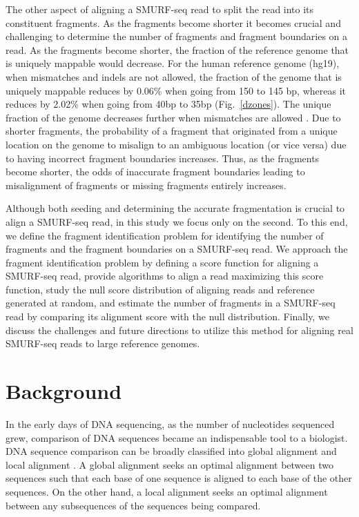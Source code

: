 The other aspect of aligning a SMURF-seq read to split the read into its
constituent fragments. As the fragments become shorter it becomes
crucial and challenging to determine the number of fragments and
fragment boundaries on a read.
%
As the fragments become shorter, the fraction of the reference genome
that is uniquely mappable would decrease. For the human reference genome
(hg19), when mismatches and indels are not allowed, the fraction of the
genome that is uniquely mappable reduces by 0.06\% when going from 150
to 145 bp, whereas it reduces by 2.02\% when going from 40bp to 35bp
(Fig.~\ref{dzones}).  The unique fraction of the genome decreases
further when mismatches are allowed \citep{derrien2012fast}.
Due to shorter fragments, the probability of a fragment that originated
from a unique location on the genome to misalign to an ambiguous
location (or vice versa) due to having incorrect fragment boundaries
increases.
%
Thus, as the fragments become shorter, the odds of inaccurate fragment
boundaries leading to misalignment of fragments or missing fragments
entirely increases.

Although both seeding and determining the accurate fragmentation is
crucial to align a SMURF-seq read, in this study we focus only on the
second.
%
To this end, we define the fragment identification problem for
identifying the number of fragments and the fragment boundaries on a
SMURF-seq read.  We approach the fragment identification problem by
defining a score function for aligning a SMURF-seq read, provide
algorithms to align a read maximizing this score function, study the
null score distribution of aligning reads and reference generated at
random, and estimate the number of fragments in a SMURF-seq read by
comparing its alignment score with the null distribution.
%
Finally, we discuss the challenges and future directions to utilize this
method for aligning real SMURF-seq reads to large reference genomes.



\section{Background}
\label{ch4_background}
In the early days of DNA sequencing, as the number of nucleotides
sequenced grew, comparison of DNA sequences became an indispensable tool
to a biologist.
%
DNA sequence comparison can be broadly classified into global alignment
\citep{needleman1970general} and local alignment
\citep{smith1981identification}. A global alignment seeks an optimal
alignment between two sequences such that each base of one sequence is
aligned to each base of the other sequences. On the other hand, a local
alignment seeks an optimal alignment between any subsequences of the
sequences being compared.

